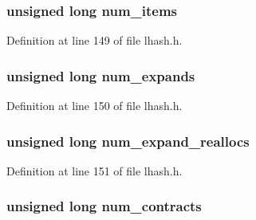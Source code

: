 \subsubsection[{\texorpdfstring{num\+\_\+items}{num_items}}]{\setlength{\rightskip}{0pt plus 5cm}unsigned long num\+\_\+items}\hypertarget{structlhash__st_acfc6ca6371aaf31bb1519bab7c790302}{}\label{structlhash__st_acfc6ca6371aaf31bb1519bab7c790302}


Definition at line 149 of file lhash.\+h.

\subsubsection[{\texorpdfstring{num\+\_\+expands}{num_expands}}]{\setlength{\rightskip}{0pt plus 5cm}unsigned long num\+\_\+expands}\hypertarget{structlhash__st_ac35d230ec4b8848866af3f5345d7f605}{}\label{structlhash__st_ac35d230ec4b8848866af3f5345d7f605}


Definition at line 150 of file lhash.\+h.

\subsubsection[{\texorpdfstring{num\+\_\+expand\+\_\+reallocs}{num_expand_reallocs}}]{\setlength{\rightskip}{0pt plus 5cm}unsigned long num\+\_\+expand\+\_\+reallocs}\hypertarget{structlhash__st_a994f967c6f54f744b1b2b6adcd6ae4dc}{}\label{structlhash__st_a994f967c6f54f744b1b2b6adcd6ae4dc}


Definition at line 151 of file lhash.\+h.

\subsubsection[{\texorpdfstring{num\+\_\+contracts}{num_contracts}}]{\setlength{\rightskip}{0pt plus 5cm}unsigned long num\+\_\+contracts}\hypertarget{structlhash__st_ab89d397a284a3c2ce3d02d949da8700f}{}\label{structlhash__st_ab89d397a284a3c2ce3d02d949da8700f}


